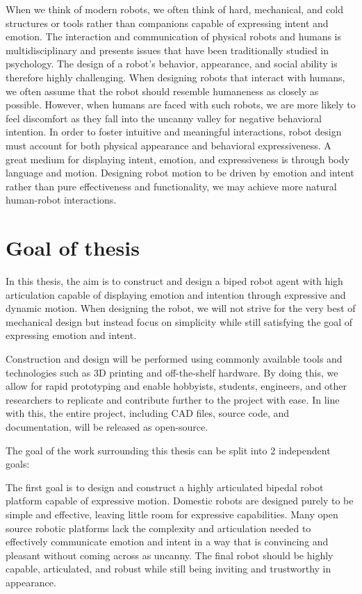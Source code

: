When we think of modern robots, we often think of hard, mechanical, and cold structures or tools rather than companions capable of expressing intent and emotion. The interaction and communication of physical robots and humans is multidisciplinary and presents issues that have been traditionally studied in psychology. The design of a robot's behavior, appearance, and social ability is therefore highly challenging. When designing robots that interact with humans, we often assume that the robot should resemble humaneness as closely as possible. However, when humans are faced with such robots, we are more likely to feel discomfort as they fall into the uncanny valley for negative behavioral intention\cite{stafford2010improved}\cite{woods2004desig}\cite{mori_uncanny_2012}. In order to foster intuitive and meaningful interactions, robot design must account for both physical appearance and behavioral expressiveness. A great medium for displaying intent, emotion, and expressiveness is through body language and motion\cite{beck2012emotional}. Designing robot motion to be driven by emotion and intent rather than pure effectiveness and functionality, we may achieve more natural human-robot interactions.

\section{Goal of thesis}

In this thesis, the aim is to construct and design a biped robot agent with high articulation capable of displaying emotion and intention through expressive and dynamic motion. When designing the robot, we will not strive for the very best of mechanical design but instead focus on simplicity while still satisfying the goal of expressing emotion and intent. 

Construction and design will be performed using commonly available tools and technologies such as 3D printing and off-the-shelf hardware. By doing this, we allow for rapid prototyping and enable hobbyists, students, engineers, and other researchers to replicate and contribute further to the project with ease. In line with this, the entire project, including CAD files, source code, and documentation, will be released as open-source.

The goal of the work surrounding this thesis can be split into 2 independent goals:

The first goal is to design and construct a highly articulated bipedal robot platform capable of expressive motion. Domestic robots are designed purely to be simple and effective, leaving little room for expressive capabilities. Many open source robotic platforms lack the complexity and articulation needed to effectively communicate emotion and intent in a way that is convincing and pleasant without coming across as uncanny. The final robot should be highly capable, articulated, and robust while still being inviting and trustworthy in appearance.

